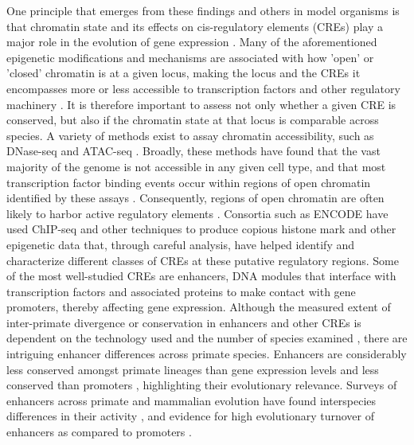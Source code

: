 One principle that emerges from these findings and others in model organisms is that chromatin state and its effects on cis-regulatory elements (CREs) play a major role in the evolution of gene expression \cite{Romero.2012, Degner.2012}. Many of the aforementioned epigenetic modifications and mechanisms are associated with how 'open' or 'closed' chromatin is at a given locus, making the locus and the CREs it encompasses more or less accessible to transcription factors and other regulatory machinery \cite{Calo.2013}. It is therefore important to assess not only whether a given CRE is conserved, but also if the chromatin state at that locus is comparable across species. A variety of methods exist to assay chromatin accessibility, such as DNase-seq and ATAC-seq \cite{Klein.2020, Tsompana.2014, Buenrostro.2015}. Broadly, these methods have found that the vast majority of the genome is not accessible in any given cell type, and that most transcription factor binding events occur within regions of open chromatin identified by these assays \cite{Thurman.2012}. Consequently, regions of open chromatin are often likely to harbor active regulatory elements \cite{Song.2011, Klemm.2019}. Consortia such as ENCODE have used ChIP-seq and other techniques to produce copious histone mark and other epigenetic data that, through careful analysis, have helped identify and characterize different classes of CREs at these putative regulatory regions\cite{consortium.2012a, Li.2018, Ernst.2012, Hoffman.2012}. Some of the most well-studied CREs are enhancers, DNA modules that interface with transcription factors and associated proteins to make contact with gene promoters, thereby affecting gene expression. Although the measured extent of inter-primate divergence or conservation in enhancers and other CREs is dependent on the technology used and the number of species examined \cite{Edsall.2019, Swain-Lenz.2019}, there are intriguing enhancer differences across primate species. Enhancers are considerably less conserved amongst primate lineages than gene expression levels \cite{Villar.2015, Berthelot.2018} and less conserved than promoters \cite{Trizzino.2017}, highlighting their evolutionary relevance. Surveys of enhancers across primate and mammalian evolution have found interspecies differences in their activity \cite{Klein.2018, Prescott.2015, Shibata.2012}, and evidence for high evolutionary turnover of enhancers as compared to promoters \cite{Carelli.2018, Villar.2015)}.

